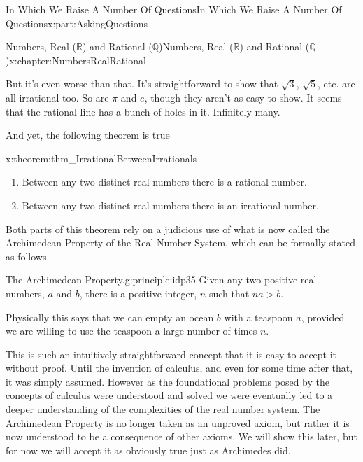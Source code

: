 \documentclass[oneside,10pt,]{book}
\numberwithin{equation}{section}
\newcommand{\RR}{\mathbb {R}}
\newcommand{\QQ}{\mathbb {Q}}
\begin{document}
\begin{partptx}{In Which We Raise A Number Of Questions}{}{In Which We Raise A Number Of Questions}{}{}{x:part:AskingQuestions}
\begin{chapterptx}{Numbers, Real (\(\RR\)) and Rational (\(\QQ\))}{}{Numbers, Real (\(\RR\)) and Rational (\(\QQ\))}{}{}{x:chapter:NumbersRealRational}
\begin{introduction}{}
\par
But it's even worse than that. It's straightforward to show that \(\sqrt{3}\), \(\sqrt{5}\), etc. are all irrational too. So are \(\pi\) and \(e\), though they aren't as easy to show. It seems that the rational line has a bunch of holes in it. Infinitely many.%
\par
And yet, the following theorem is true%
\begin{theorem}{}{}{x:theorem:thm_IrrationalBetweenIrrationals}%
\index{\(\RR\)!real numbers exist between real numbers}%
\begin{enumerate}[label=(\alph*)]
\item{}Between any two distinct real numbers there is a rational number.%
\item{}Between any two distinct real numbers there is an irrational number.%
\end{enumerate}
%
\end{theorem}
Both parts of this theorem rely on a judicious use of what is now called the Archimedean Property of the Real Number System, which can be formally stated as follows.%
\begin{principle}{The Archimedean Property.}{}{g:principle:idp35}%
 Given any two positive real numbers, \(a\) and \(b\), there is a positive integer, \(n\) such that \(na>b\).%
\end{principle}
Physically this says that we can empty an ocean \(b\) with a teaspoon \(a\), provided we are willing to use the teaspoon a large number of times \(n\).%
\par
This is such an intuitively straightforward concept that it is easy to accept it without proof. Until the invention of calculus, and even for some time after that, it was simply assumed. However as the foundational problems posed by the concepts of calculus were understood and solved we were eventually led to a deeper understanding of the complexities of the real number system. The Archimedean Property is no longer taken as an unproved axiom, but rather it is now understood to be a consequence of other axioms. We will show this later, but for now we will accept it as obviously true just as Archimedes did.%
\par

\end{introduction}
\end{chapterptx}
\end{partptx}
\end{document}
